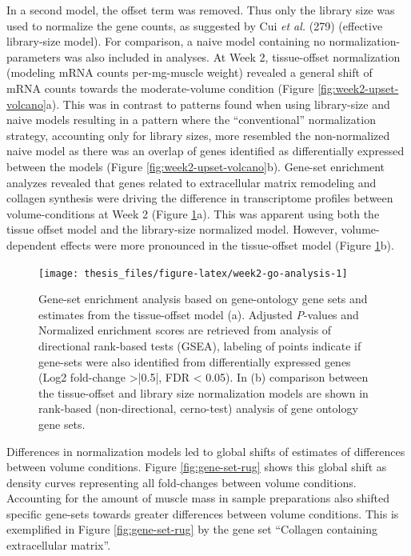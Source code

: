 \documentclass[twoside,10pt]{gihclass} %
\begin{document}
In a second model, the offset term was removed. Thus only the library size was used to normalize the gene counts, as suggested by Cui \emph{et al.}
(279) (effective library-size model).
For comparison, a naive model containing no normalization-parameters was also included in analyses.
At Week 2, tissue-offset normalization (modeling mRNA counts per-mg-muscle weight) revealed a general shift of mRNA counts towards the moderate-volume condition (Figure \ref{fig:week2-upset-volcano}a).
This was in contrast to patterns found when using library-size and naive models resulting in a pattern where the ``conventional'' normalization strategy, accounting only for library sizes, more resembled the non-normalized naive model as there was an overlap of genes identified as differentially expressed between the models (Figure \ref{fig:week2-upset-volcano}b).
Gene-set enrichment analyzes revealed that genes related to extracellular matrix remodeling and collagen synthesis were driving the difference in transcriptome profiles between volume-conditions at Week 2
(Figure \ref{fig:week2-go-analysis}a).
This was apparent using both the tissue offset model and the library-size normalized model. However, volume-dependent effects were more pronounced in the tissue-offset model
(Figure \ref{fig:week2-go-analysis}b).
\begin{figure}

{\centering \texttt{[image: thesis\_files/figure-latex/week2-go-analysis-1]} 

}

\caption[Gene-set enrichment analysis at Week 2]{Gene-set enrichment analysis based on gene-ontology gene sets and estimates from the tissue-offset model (a). Adjusted \textit{P}-values and Normalized enrichment scores are retrieved from analysis of directional rank-based tests (GSEA), labeling of points indicate if gene-sets were also identified from differentially expressed genes (Log2 fold-change >|0.5|, FDR < 0.05). In (b) comparison between the tissue-offset and library size normalization models are shown in rank-based (non-directional, cerno-test) analysis of gene ontology gene sets.}\label{fig:week2-go-analysis}
\end{figure}
Differences in normalization models led to global shifts of estimates of differences between volume conditions. Figure \ref{fig:gene-set-rug} shows this global shift as density curves representing all fold-changes between volume conditions. Accounting for the amount of muscle mass in sample preparations also shifted specific gene-sets towards greater differences between volume conditions. This is exemplified in Figure \ref{fig:gene-set-rug} by the gene set ``Collagen containing extracellular matrix''.
\end{document}
